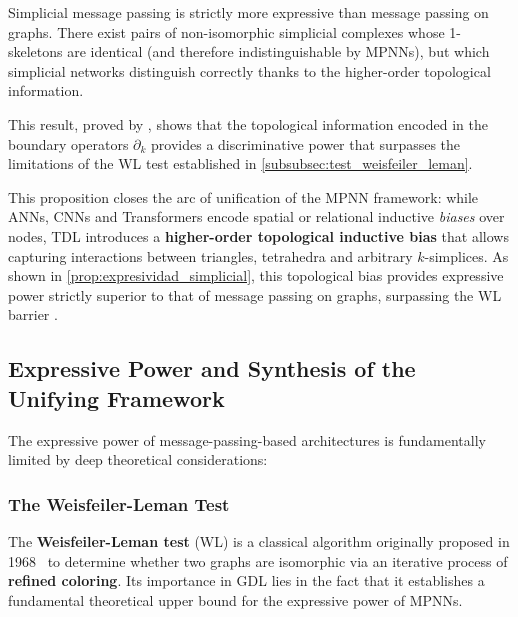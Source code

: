 \begin{proposition}\label{prop:expresividad_simplicial}
	Simplicial message passing is strictly more expressive than message passing on graphs. There exist pairs of non-isomorphic simplicial complexes whose 1-skeletons are identical (and therefore indistinguishable by \glspl{MPNN}), but which simplicial networks distinguish correctly thanks to the higher-order topological information.
\end{proposition}

This result, proved by \citet{bodnar2021weisfeiler}, shows that the topological information encoded in the boundary operators $\partial_k$ provides a discriminative power that surpasses the limitations of the \gls{WL} test established in \autoref{subsubsec:test_weisfeiler_leman}.

This proposition closes the arc of unification of the \gls{MPNN} framework: while \glspl{ANN}, \glspl{CNN} and \glspl{Transformer} encode spatial or relational inductive \textit{biases} over nodes, \gls{TDL} introduces a \textbf{higher-order topological inductive bias} that allows capturing interactions between triangles, tetrahedra and arbitrary $k$-simplices. As shown in \autoref{prop:expresividad_simplicial}, this topological bias provides expressive power strictly superior to that of message passing on graphs, surpassing the \gls{WL} barrier \citep{bodnar2021weisfeiler, hajij2023topological}.

\subsection{Expressive Power and Synthesis of the Unifying Framework}\label{subsec:poder_expresivo_sintesis}

The expressive power of message-passing-based architectures is fundamentally limited by deep theoretical considerations:

\subsubsection{The Weisfeiler-Leman Test}\label{subsubsec:test_weisfeiler_leman}

The \textbf{Weisfeiler-Leman test} (\gls{WL}) is a classical algorithm originally proposed in 1968~\citep{weisfeiler1968reduction} to determine whether two graphs are isomorphic via an iterative process of \textbf{refined coloring}. Its importance in \gls{GDL} lies in the fact that it establishes a fundamental theoretical upper bound for the expressive power of \glspl{MPNN}.

